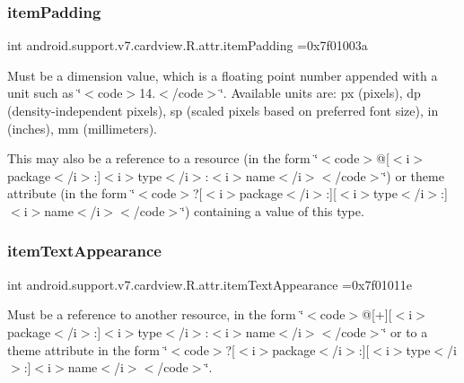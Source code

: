\subsubsection{\texorpdfstring{item\+Padding}{itemPadding}}
{\footnotesize\ttfamily int android.\+support.\+v7.\+cardview.\+R.\+attr.\+item\+Padding =0x7f01003a\hspace{0.3cm}{\ttfamily [static]}}

Must be a dimension value, which is a floating point number appended with a unit such as \char`\"{}$<$code$>$14.\+5sp$<$/code$>$\char`\"{}. Available units are\+: px (pixels), dp (density-\/independent pixels), sp (scaled pixels based on preferred font size), in (inches), mm (millimeters). 

This may also be a reference to a resource (in the form \char`\"{}$<$code$>$@\mbox{[}$<$i$>$package$<$/i$>$\+:\mbox{]}$<$i$>$type$<$/i$>$\+:$<$i$>$name$<$/i$>$$<$/code$>$\char`\"{}) or theme attribute (in the form \char`\"{}$<$code$>$?\mbox{[}$<$i$>$package$<$/i$>$\+:\mbox{]}\mbox{[}$<$i$>$type$<$/i$>$\+:\mbox{]}$<$i$>$name$<$/i$>$$<$/code$>$\char`\"{}) containing a value of this type. \mbox{\label{classandroid_1_1support_1_1v7_1_1cardview_1_1R_1_1attr_abfcdf49cb02e19d0dd2116941f919c40}} 
\subsubsection{\texorpdfstring{item\+Text\+Appearance}{itemTextAppearance}}
{\footnotesize\ttfamily int android.\+support.\+v7.\+cardview.\+R.\+attr.\+item\+Text\+Appearance =0x7f01011e\hspace{0.3cm}{\ttfamily [static]}}

Must be a reference to another resource, in the form \char`\"{}$<$code$>$@\mbox{[}+\mbox{]}\mbox{[}$<$i$>$package$<$/i$>$\+:\mbox{]}$<$i$>$type$<$/i$>$\+:$<$i$>$name$<$/i$>$$<$/code$>$\char`\"{} or to a theme attribute in the form \char`\"{}$<$code$>$?\mbox{[}$<$i$>$package$<$/i$>$\+:\mbox{]}\mbox{[}$<$i$>$type$<$/i$>$\+:\mbox{]}$<$i$>$name$<$/i$>$$<$/code$>$\char`\"{}. \mbox{\label{classandroid_1_1support_1_1v7_1_1cardview_1_1R_1_1attr_a178b859ac1d854093896f5a61d0f5dbf}} 
